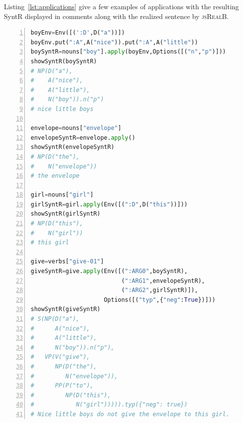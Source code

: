 \documentclass[12pt]{article}
\newcommand{\systeme}[1]{\textsc{#1}}
\newcommand{\jsr}{\systeme{jsRealB}}
\newcommand{\representation}[1]{\textsf{#1}}
\newcommand{\SYNTR}{\representation{SyntR}}
\begin{document}
Listing~\ref{lst:applications} give a few examples of applications with the resulting \SYNTR{} displayed in comments along with the realized sentence by \jsr{}.
\begin{lstlisting}[language=Python,basicstyle=\ttfamily\footnotesize,
                   numbers=left,numbersep=5pt,numberstyle=\tiny,
                   aboveskip=\medskipamount,float=ht,
                   caption={Examples of lambda applications},
                   label=lst:applications]
boyEnv=Env([(':D',D("a"))])
boyEnv.put(":A",A("nice")).put(":A",A("little"))
boySyntR=nouns["boy"].apply(boyEnv,Options([("n","p")]))
showSyntR(boySyntR) 
# NP(D("a"),
#    A("nice"),
#    A("little"),
#    N("boy")).n("p")
# nice little boys

envelope=nouns["envelope"]
envelopeSyntR=envelope.apply()
showSyntR(envelopeSyntR)
# NP(D("the"),
#    N("envelope"))
# the envelope

girl=nouns["girl"]
girlSyntR=girl.apply(Env([(":D",D("this"))]))
showSyntR(girlSyntR)
# NP(D("this"),
#    N("girl"))
# this girl

give=verbs["give-01"]
giveSyntR=give.apply(Env([(":ARG0",boySyntR),
                          (":ARG1",envelopeSyntR),
                          (":ARG2",girlSyntR)]),
                     Options([("typ",{"neg":True})]))
showSyntR(giveSyntR)
# S(NP(D("a"),
#      A("nice"),
#      A("little"),
#      N("boy")).n("p"),
#   VP(V("give"),
#      NP(D("the"),
#         N("envelope")),
#      PP(P("to"),
#         NP(D("this"),
#            N("girl"))))).typ({"neg": true})
# Nice little boys do not give the envelope to this girl.
\end{lstlisting}
\end{document}
